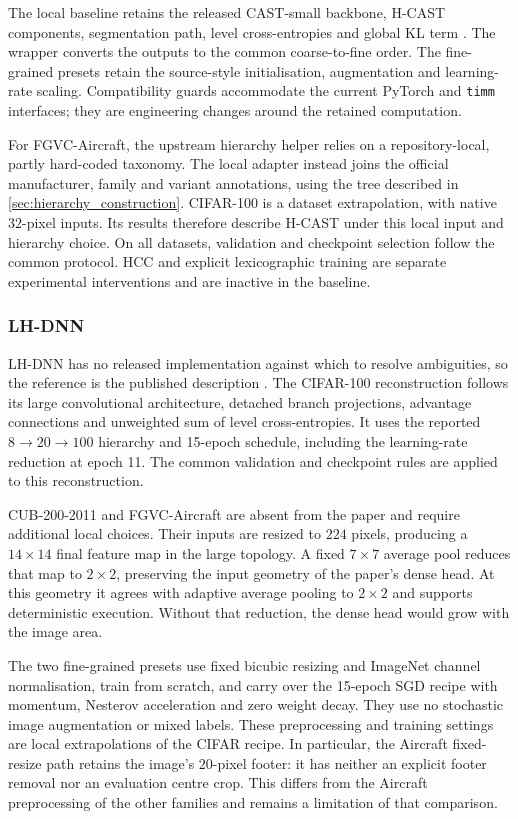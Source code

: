 The local baseline retains the released CAST-small backbone, H-CAST components,
segmentation path, level cross-entropies and global KL term
\cite{park2024visually}. The wrapper converts the outputs to the common
coarse-to-fine order. The fine-grained presets retain the source-style
initialisation, augmentation and learning-rate scaling. Compatibility guards
accommodate the current PyTorch and \texttt{timm} interfaces; they are engineering
changes around the retained computation.

For FGVC-Aircraft, the upstream hierarchy helper relies on a repository-local,
partly hard-coded taxonomy. The local adapter instead joins the official
manufacturer, family and variant annotations, using the tree described in
\cref{sec:hierarchy_construction}. CIFAR-100 is a dataset extrapolation, with
native $32$-pixel inputs. Its results therefore describe H-CAST under this
local input and hierarchy choice. On all datasets, validation and checkpoint
selection follow the common protocol. HCC and explicit lexicographic training
are separate experimental interventions and are inactive in the baseline.

\subsubsection{LH-DNN}
\label{sssec:fidelity_lhdnn}

LH-DNN has no released implementation against which to resolve ambiguities, so
the reference is the published description \cite{fiaschi2024informed}. The
CIFAR-100 reconstruction follows its large convolutional architecture,
detached branch projections, advantage connections and unweighted sum of level
cross-entropies. It uses the reported $8\to20\to100$ hierarchy and 15-epoch
schedule, including the learning-rate reduction at epoch 11. The common
validation and checkpoint rules are applied to this reconstruction.

CUB-200-2011 and FGVC-Aircraft are absent from the paper and require additional
local choices. Their inputs are resized to $224$ pixels, producing a
$14\times14$ final feature map in the large topology. A fixed $7\times7$
average pool reduces that map to $2\times2$, preserving the input geometry of
the paper's dense head. At this geometry it agrees with adaptive average
pooling to $2\times2$ and supports deterministic execution. Without that
reduction, the dense head would grow with the image area.

The two fine-grained presets use fixed bicubic resizing and ImageNet channel
normalisation, train from scratch, and carry over the 15-epoch SGD recipe with
momentum, Nesterov acceleration and zero weight decay. They use no stochastic
image augmentation or mixed labels. These preprocessing and training settings
are local extrapolations of the CIFAR recipe. In particular, the Aircraft
fixed-resize path retains the image's $20$-pixel footer: it has neither an
explicit footer removal nor an evaluation centre crop. This differs from the
Aircraft preprocessing of the other families and remains a limitation of that
comparison.

